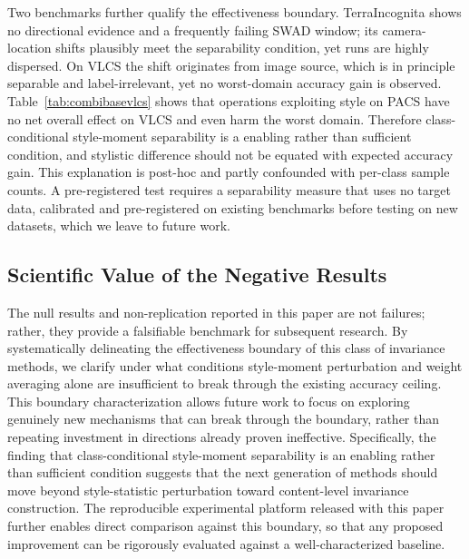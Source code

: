 \documentclass[electronics,article,submit,moreauthors]{Definitions/mdpi}
\newcommand{\add}[1]{\textcolor{addblue}{#1}}
\newcommand{\del}[1]{\textcolor{delred}{\st{#1}}}
\def\add#1{#1}%
\def\del#1{}%
\renewcommand{\add}[1]{#1}
\renewcommand{\del}[1]{}
\begin{document}
Two benchmarks further qualify the effectiveness boundary. \del{TerraIncognita retains a positive worst-domain direction but its intervals include zero; its camera-location shifts plausibly meet the separability condition, yet runs are highly dispersed.}\add{TerraIncognita shows no directional evidence and a frequently failing SWAD window; its camera-location shifts plausibly meet the separability condition, yet runs are highly dispersed.} On VLCS the shift originates from image source, which is in principle separable and label-irrelevant, yet no worst-domain accuracy gain is observed. Table~\ref{tab:combibasevlcs} shows that operations exploiting style on PACS have no net overall effect on VLCS and even harm the worst domain. Therefore class-conditional style-moment separability is a \del{necessary}\add{enabling} rather than sufficient condition, and stylistic difference should not be equated with expected accuracy gain. This explanation is post-hoc and partly confounded with per-class sample counts. A pre-registered test requires a separability measure that uses no target data, calibrated and pre-registered on existing benchmarks before testing on new datasets, which we leave to future work.

\subsection{Scientific Value of the Negative Results}

The null results and non-replication reported in this paper are not failures; rather, they provide a falsifiable benchmark for subsequent research. By systematically delineating the effectiveness boundary of this class of invariance methods, we clarify under what conditions style-moment perturbation and weight averaging alone are insufficient to break through the existing accuracy ceiling. This boundary characterization allows future work to focus on exploring genuinely new mechanisms that can break through the boundary, rather than repeating investment in directions already proven ineffective. Specifically, the finding that class-conditional style-moment separability is \del{necessary but not sufficient}\add{an enabling rather than sufficient condition} suggests that the next generation of methods should move beyond style-statistic perturbation toward content-level invariance construction. The reproducible experimental platform released with this paper further enables direct comparison against this boundary, so that any proposed improvement can be rigorously evaluated against a well-characterized baseline.
\end{document}
